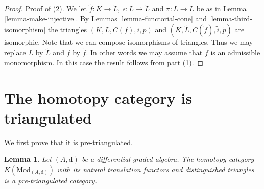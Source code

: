\documentclass{stacks-project}
\theoremstyle{plain}
\newtheorem{lemma}[subsection]{Lemma}
\theoremstyle{definition}
\theoremstyle{remark}
\numberwithin{equation}{subsection}
\begin{document}
\begin{proof}
\medskip\noindent
Proof of (2). We let $\tilde f : K \to \tilde L$,
$s : L \to \tilde L$
and $\pi : L \to L$ be as in
Lemma \ref{lemma-make-injective}. By
Lemmas \ref{lemma-functorial-cone} and \ref{lemma-third-isomorphism}
the triangles $(K, L, C(f), i, p)$ and
$(K, \tilde L, C(\tilde f), \tilde i, \tilde p)$
are isomorphic. Note that we can compose isomorphisms of
triangles. Thus we may replace $L$ by
$\tilde L$ and $f$ by $\tilde f$. In other words
we may assume that $f$ is an admissible monomorphism.
In this case the result follows from part (1).
\end{proof}







\section{The homotopy category is triangulated}
\label{section-homotopy-triangulated}

\noindent
We first prove that it is pre-triangulated.

\begin{lemma}
\label{lemma-homotopy-category-pre-triangulated}
Let $(A, \text{d})$ be a differential graded algebra.
The homotopy category $K(\text{Mod}_{(A, \text{d})})$
with its natural translation functors and distinguished triangles
is a pre-triangulated category.
\end{lemma}
\end{document}
